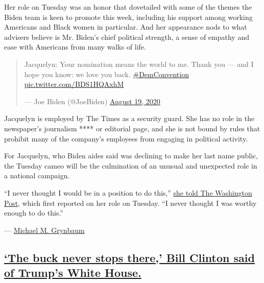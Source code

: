 Her role on Tuesday was an honor that dovetailed with some of the themes
the Biden team is keen to promote this week, including his support among
working Americans and Black women in particular. And her appearance nods
to what advisers believe is Mr. Biden's chief political strength, a
sense of empathy and ease with Americans from many walks of life.

\begin{quote}
Jacquelyn: Your nomination means the world to me. Thank you --- and I
hope you know: we love you back.
\href{https://twitter.com/hashtag/DemConvention?src=hash\&ref_src=twsrc\%5Etfw}{\#DemConvention}
\href{https://t.co/BDS1HQAxhM}{pic.twitter.com/BDS1HQAxhM}

--- Joe Biden (@JoeBiden)
\href{https://twitter.com/JoeBiden/status/1295900540694433792?ref_src=twsrc\%5Etfw}{August
19, 2020}
\end{quote}

Jacquelyn is employed by The Times as a security guard. She has no role
in the newspaper's journalism **** or editorial page, and she is not
bound by rules that prohibit many of the company's employees from
engaging in political activity.

For Jacquelyn, who Biden aides said was declining to make her last name
public, the Tuesday cameo will be the culmination of an unusual and
unexpected role in a national campaign.

``I never thought I would be in a position to do this,''
\href{https://www.washingtonpost.com/politics/the-security-guard-blurted-i-love-you-to-joe-biden-in-an-elevator-one-viral-video-later-she-will-nominate-him-for-president/2020/08/18/df652f04-e178-11ea-b69b-64f7b0477ed4_story.html}{she
told The Washington Post}, which first reported on her role on Tuesday.
``I never thought I was worthy enough to do this.''

---
\href{https://www.nytimes3xbfgragh.onion/by/michael-m-grynbaum}{Michael
M. Grynbaum}

\hypertarget{the-buck-never-stops-there-bill-clinton-said-of-trumps-white-house}{%
\subsection{\texorpdfstring{\protect\hyperlink{the-buck-never-stops-there-bill-clinton-said-of-trumps-white-house}{`The
buck never stops there,' Bill Clinton said of Trump's White
House.}}{`The buck never stops there,' Bill Clinton said of Trump's White House.}}\label{the-buck-never-stops-there-bill-clinton-said-of-trumps-white-house}}

